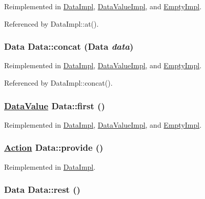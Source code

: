 Reimplemented in \hyperlink{classDataImpl_a4}{Data\-Impl}, \hyperlink{classDataValueImpl_a4}{Data\-Value\-Impl}, and \hyperlink{classEmptyImpl_a0}{Empty\-Impl}.

Referenced by Data\-Impl::at().

\hypertarget{interfaceData_a0}{
\subsubsection[concat]{\setlength{\rightskip}{0pt plus 5cm}Data Data::concat (Data {\em data})}}
\label{interfaceData_a0}




Reimplemented in \hyperlink{classDataImpl_a0}{Data\-Impl}, \hyperlink{classDataValueImpl_a3}{Data\-Value\-Impl}, and \hyperlink{classEmptyImpl_a2}{Empty\-Impl}.

Referenced by Data\-Impl::concat().

\hypertarget{interfaceData_a2}{
\subsubsection[first]{\setlength{\rightskip}{0pt plus 5cm}\hyperlink{interfaceDataValue}{Data\-Value} Data::first ()}}
\label{interfaceData_a2}




Reimplemented in \hyperlink{classDataImpl_a2}{Data\-Impl}, \hyperlink{classDataValueImpl_a0}{Data\-Value\-Impl}, and \hyperlink{classEmptyImpl_a1}{Empty\-Impl}.\hypertarget{interfaceData_a5}{
\subsubsection[provide]{\setlength{\rightskip}{0pt plus 5cm}\hyperlink{interfaceAction}{Action} Data::provide ()}}
\label{interfaceData_a5}




Reimplemented in \hyperlink{classDataImpl_a5}{Data\-Impl}.\hypertarget{interfaceData_a3}{
\subsubsection[rest]{\setlength{\rightskip}{0pt plus 5cm}Data Data::rest ()}}
\label{interfaceData_a3}




